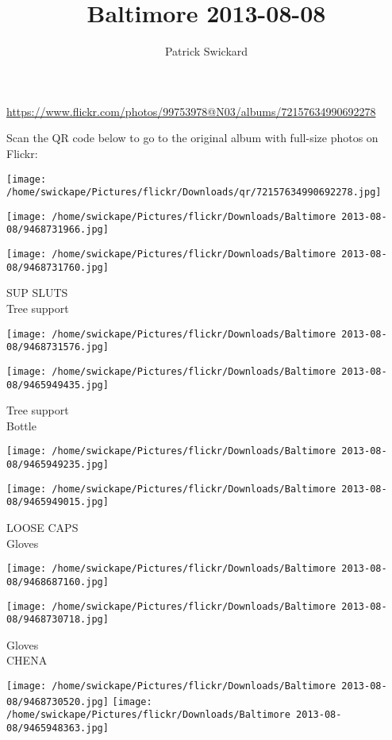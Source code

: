 \documentclass[10pt,letterpaper]{article}
\title{Baltimore 2013-08-08}
\author{Patrick Swickard}
\date{}
\begin{document}
\maketitle

\url{https://www.flickr.com/photos/99753978@N03/albums/72157634990692278}

Scan the QR code below to go to the original album with full-size photos on Flickr:

\texttt{[image: /home/swickape/Pictures/flickr/Downloads/qr/72157634990692278.jpg]}
\pagebreak

\texttt{[image: /home/swickape/Pictures/flickr/Downloads/Baltimore 2013-08-08/9468731966.jpg]}

\vspace{0.25in}
\texttt{[image: /home/swickape/Pictures/flickr/Downloads/Baltimore 2013-08-08/9468731760.jpg]}

SUP SLUTS\\
Tree support
\pagebreak

\texttt{[image: /home/swickape/Pictures/flickr/Downloads/Baltimore 2013-08-08/9468731576.jpg]}

\vspace{0.25in}
\texttt{[image: /home/swickape/Pictures/flickr/Downloads/Baltimore 2013-08-08/9465949435.jpg]}

Tree support\\
Bottle
\pagebreak

\texttt{[image: /home/swickape/Pictures/flickr/Downloads/Baltimore 2013-08-08/9465949235.jpg]}

\vspace{0.25in}
\texttt{[image: /home/swickape/Pictures/flickr/Downloads/Baltimore 2013-08-08/9465949015.jpg]}

LOOSE CAPS\\
Gloves
\pagebreak

\texttt{[image: /home/swickape/Pictures/flickr/Downloads/Baltimore 2013-08-08/9468687160.jpg]}

\vspace{0.25in}
\texttt{[image: /home/swickape/Pictures/flickr/Downloads/Baltimore 2013-08-08/9468730718.jpg]}

Gloves\\
CHENA
\pagebreak

\texttt{[image: /home/swickape/Pictures/flickr/Downloads/Baltimore 2013-08-08/9468730520.jpg]}
\texttt{[image: /home/swickape/Pictures/flickr/Downloads/Baltimore 2013-08-08/9465948363.jpg]}
\end{document}
